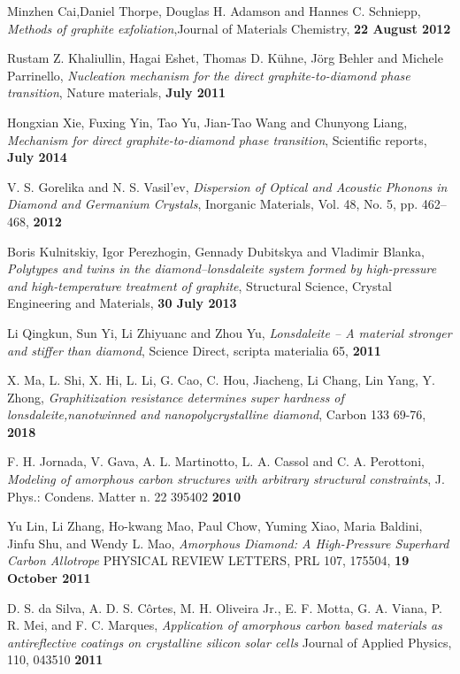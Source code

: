 \documentclass[a4paper,titlepage]{book}
\begin{document}
\begin{thebibliography}{99}
Minzhen Cai,Daniel Thorpe, Douglas H. Adamson and Hannes C. Schniepp, \textit{Methods of graphite exfoliation},Journal of Materials Chemistry,  \textbf { 22 August 2012}

Rustam Z. Khaliullin, Hagai Eshet, Thomas D. Kühne, Jörg Behler and Michele Parrinello, \textit{Nucleation mechanism for the direct graphite-to-diamond phase transition}, Nature materials,  \textbf { July 2011}

Hongxian Xie, Fuxing Yin, Tao Yu, Jian-Tao Wang and Chunyong Liang, \textit{Mechanism for direct graphite-to-diamond phase transition}, Scientific reports, \textbf { July 2014}

V. S. Gorelika and N. S. Vasil’ev, \textit{Dispersion of Optical and Acoustic Phonons in Diamond and Germanium Crystals}, Inorganic Materials, Vol. 48, No. 5, pp. 462–468, \textbf {2012}

Boris Kulnitskiy, Igor Perezhogin, Gennady Dubitskya and Vladimir Blanka, \textit{Polytypes and twins in the diamond–lonsdaleite system formed by high-pressure and high-temperature treatment of graphite}, Structural Science, Crystal Engineering and Materials, \textbf { 30 July 2013}

Li Qingkun, Sun Yi, Li Zhiyuanc and Zhou Yu, \textit{Lonsdaleite – A material stronger and stiffer than diamond}, Science Direct, scripta materialia 65, \textbf{2011}

X. Ma, L. Shi, X. Hi, L. Li, G. Cao, C. Hou, Jiacheng, Li Chang, Lin Yang, Y. Zhong, \textit{Graphitization resistance determines super hardness of lonsdaleite,nanotwinned and nanopolycrystalline diamond}, Carbon 133 69-76, \textbf{2018}

F. H. Jornada, V. Gava, A. L. Martinotto, L. A. Cassol and C. A. Perottoni, \textit{Modeling of amorphous carbon structures with arbitrary structural constraints}, J. Phys.: Condens. Matter n. 22 395402 \textbf{2010}

Yu Lin, Li Zhang, Ho-kwang Mao, Paul Chow, Yuming Xiao, Maria Baldini, Jinfu Shu, and Wendy L. Mao,
\textit{Amorphous Diamond: A High-Pressure Superhard Carbon Allotrope} PHYSICAL REVIEW LETTERS, PRL 107, 175504,  \textbf{19 October 2011}

D. S. da Silva, A. D. S. Côrtes, M. H. Oliveira Jr., E. F. Motta, G. A. Viana, P. R. Mei, and F. C. Marques,
\textit{Application of amorphous carbon based materials as antireflective coatings on crystalline silicon solar cells} Journal of Applied Physics, 110, 043510  \textbf{2011}


\end{thebibliography}
\end{document}
